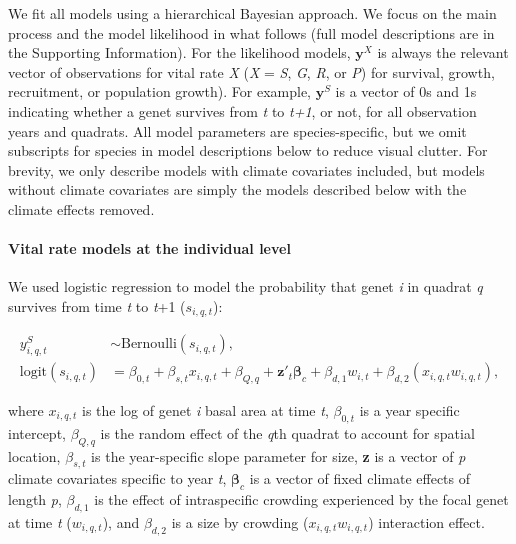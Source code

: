 \documentclass[12pt,]{article}
\begin{document}
We fit all models using a hierarchical Bayesian approach. We focus on
the main process and the model likelihood in what follows (full model
descriptions are in the Supporting Information). For the likelihood
models, \(\textbf{y}^X\) is always the relevant vector of observations
for vital rate \emph{X} (\emph{X} = \emph{S}, \emph{G}, \emph{R}, or
\emph{P}) for survival, growth, recruitment, or population growth). For
example, \(\textbf{y}^S\) is a vector of 0s and 1s indicating whether a
genet survives from \emph{t} to \emph{t+1}, or not, for all observation
years and quadrats. All model parameters are species-specific, but we
omit subscripts for species in model descriptions below to reduce visual
clutter. For brevity, we only describe models with climate covariates
included, but models without climate covariates are simply the models
described below with the climate effects removed.

\paragraph{Vital rate models at the individual
level}\label{vital-rate-models-at-the-individual-level}

We used logistic regression to model the probability that genet \emph{i}
in quadrat \emph{q} survives from time \emph{t} to \emph{t}+1
(\(s_{i,q,t}\)):

\vspace{-3em}\begin{align}
y_{i,q,t}^{S} &\sim \text{Bernoulli}(s_{i,q,t}), \\
\text{logit}(s_{i,q,t}) &= \beta_{0,t} + \beta_{s,t}x_{i,q,t} + \beta_{Q,q} + \textbf{z}'_t \boldsymbol{\beta}_c + \beta_{d,1} w_{i,t} + \beta_{d,2} (x_{i,q,t}w_{i,q,t}),
\end{align}\vspace{-3em}

where \(x_{i,q,t}\) is the log of genet \emph{i} basal area at time
\emph{t}, \(\beta_{0,t}\) is a year specific intercept, \(\beta_{Q,q}\)
is the random effect of the \emph{q}th quadrat to account for spatial
location, \(\beta_{s,t}\) is the year-specific slope parameter for size,
\textbf{z} is a vector of \emph{p} climate covariates specific to year
\emph{t}, \(\boldsymbol{\beta}_c\) is a vector of fixed climate effects
of length \emph{p}, \(\beta_{d,1}\) is the effect of intraspecific
crowding experienced by the focal genet at time \emph{t}
(\(w_{i,q,t}\)), and \(\beta_{d,2}\) is a size by crowding
(\(x_{i,q,t}w_{i,q,t}\)) interaction effect.
\end{document}
